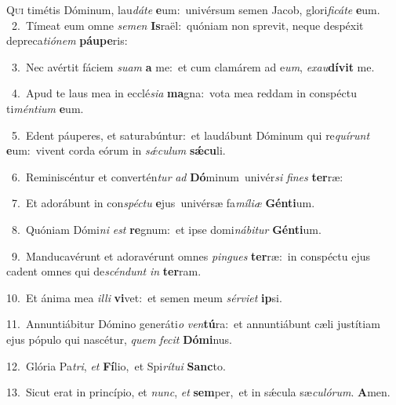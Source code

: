 \lettrine{\initial\textcolor{\initialcolor}{Q}}{ui} timétis Dóminum, lau\-\textit{dá}\-\textit{te} \textbf{e}\-um:~\star univérsum semen Jacob, glori\-\textit{fi}\-\textit{cá}\textit{te} \textbf{e}\-um.\\
{\numbfont\textcolor{\numbcolor}{~2.}}~Tímeat eum omne \textit{se}\-\textit{men} \textbf{Is}\-raël:~\star quóniam non sprevit, neque despéxit depreca\-\textit{ti}\-\textit{ó}\textit{nem} \textbf{páu}\-\textbf{pe}ris:\par
{\numbfont\textcolor{\numbcolor}{~3.}}~Nec avértit fáciem \textit{su}\-\textit{am} \textbf{a} me:~\star et cum clamárem ad e\-\textit{um}\-, \textit{ex}\-\textit{au}\textbf{dí}\textbf{vit} me.\par
{\numbfont\textcolor{\numbcolor}{~4.}}~Apud te laus mea in ecclé\-\textit{si}\-\textit{a} \textbf{ma}\-gna:~\star vota mea reddam in conspéctu ti\-\textit{mén}\-\textit{ti}\textit{um} \textbf{e}\-um.\par
{\numbfont\textcolor{\numbcolor}{~5.}}~Edent páuperes, et saturabúntur:~\dagger et laudábunt Dóminum qui re\-\textit{quí}\-\textit{runt} \textbf{e}\-um:~\star vivent corda eórum in \textit{sǽ}\-\textit{cu}\textit{lum} \textbf{sǽ}\-\textbf{cu}li.\par
{\numbfont\textcolor{\numbcolor}{~6.}}~Reminiscéntur et convertén\textit{tur} \textit{ad} \textbf{Dó}\-minum~\star univér\textit{si} \textit{fi}\-\textit{nes} \textbf{ter}\-ræ:\par
{\numbfont\textcolor{\numbcolor}{~7.}}~Et adorábunt in con\-\textit{spéc}\-\textit{tu} \textbf{e}\-jus~\star univérsæ fa\-\textit{mí}\-\textit{li}\textit{æ} \textbf{Gén}\-\textbf{ti}um.\par
{\numbfont\textcolor{\numbcolor}{~8.}}~Quóniam Dómi\textit{ni} \textit{est} \textbf{re}\-gnum:~\star et ipse domi\-\textit{ná}\-\textit{bi}\textit{tur} \textbf{Gén}\-\textbf{ti}um.\par
{\numbfont\textcolor{\numbcolor}{~9.}}~Manducavérunt et adoravérunt omnes \textit{pin}\-\textit{gues} \textbf{ter}\-ræ:~\star in conspéctu ejus cadent omnes qui de\-\textit{scén}\-\textit{dunt} \textit{in} \textbf{ter}\-ram.\par
{\numbfont\textcolor{\numbcolor}{10.}}~Et ánima mea \textit{il}\-\textit{li} \textbf{vi}\-vet:~\star et semen meum \textit{sér}\-\textit{vi}\textit{et} \textbf{ip}\-si.\par
{\numbfont\textcolor{\numbcolor}{11.}}~Annuntiábitur Dómino generáti\textit{o} \textit{ven}\-\textbf{tú}ra:~\star et annuntiábunt cæli justítiam ejus pópulo qui nascétur, \textit{quem} \textit{fe}\-\textit{cit} \textbf{Dó}\-\textbf{mi}nus.\par
{\numbfont\textcolor{\numbcolor}{12.}}~Glória Pa\-\textit{tri}\-, \textit{et} \textbf{Fí}\-lio,~\star et Spi\-\textit{rí}\-\textit{tu}\textit{i} \textbf{Sanc}\-to.\par
{\numbfont\textcolor{\numbcolor}{13.}}~Sicut erat in princípio, et \textit{nunc}\-, \textit{et} \textbf{sem}\-per,~\star et in sǽcula sæ\-\textit{cu}\-\textit{ló}\textit{rum}. \textbf{A}\-men.\par
